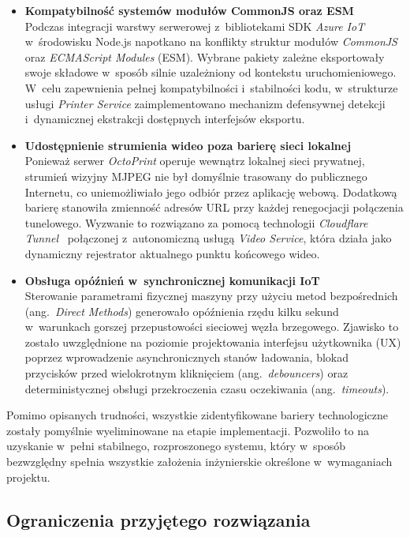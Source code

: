 \documentclass[a4paper,12pt,reqno]{article}
\begin{document}
\begin{itemize}
	\item \textbf{Kompatybilność systemów modułów CommonJS oraz ESM} \\
	Podczas integracji warstwy serwerowej z~bibliotekami SDK \textit{Azure IoT} w~środowisku Node.js napotkano na konflikty struktur modułów \textit{CommonJS} oraz \textit{ECMAScript Modules} (ESM). Wybrane pakiety zależne eksportowały swoje składowe w~sposób silnie uzależniony od kontekstu uruchomieniowego. W~celu zapewnienia pełnej kompatybilności i~stabilności kodu, w~strukturze usługi \textit{Printer Service} zaimplementowano mechanizm defensywnej detekcji i~dynamicznej ekstrakcji dostępnych interfejsów eksportu.
	
	\item \textbf{Udostępnienie strumienia wideo poza barierę sieci lokalnej} \\
	Ponieważ serwer \textit{OctoPrint} operuje wewnątrz lokalnej sieci prywatnej, strumień wizyjny MJPEG nie był domyślnie trasowany do publicznego Internetu, co uniemożliwiało jego odbiór przez aplikację webową. Dodatkową barierę stanowiła zmienność adresów URL przy każdej renegocjacji połączenia tunelowego. Wyzwanie to rozwiązano za pomocą technologii \textit{Cloudflare Tunnel}~\cite{cloudflare} połączonej z~autonomiczną usługą \textit{Video Service}, która działa jako dynamiczny rejestrator aktualnego punktu końcowego wideo.
	
	\item \textbf{Obsługa opóźnień w~synchronicznej komunikacji IoT} \\
	Sterowanie parametrami fizycznej maszyny przy użyciu metod bezpośrednich (ang.~\textit{Direct Methods}) generowało opóźnienia rzędu kilku sekund w~warunkach gorszej przepustowości sieciowej węzła brzegowego. Zjawisko to zostało uwzględnione na poziomie projektowania interfejsu użytkownika (UX) poprzez wprowadzenie asynchronicznych stanów ładowania, blokad przycisków przed wielokrotnym kliknięciem (ang.~\textit{debouncers}) oraz deterministycznej obsługi przekroczenia czasu oczekiwania (ang.~\textit{timeouts}).
\end{itemize}

\noindent Pomimo opisanych trudności, wszystkie zidentyfikowane bariery technologiczne zostały pomyślnie wyeliminowane na etapie implementacji. Pozwoliło to na uzyskanie w~pełni stabilnego, rozproszonego systemu, który w~sposób bezwzględny spełnia wszystkie założenia inżynierskie określone w~wymaganiach projektu.

\subsection{Ograniczenia przyjętego rozwiązania}
\end{document}
